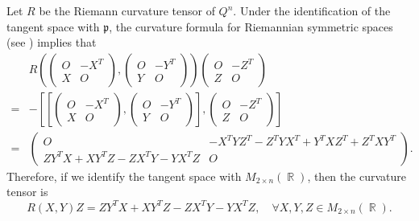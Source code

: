 \documentclass[11pt]{amsart}
\theoremstyle{plain}
\theoremstyle{definition}
\numberwithin{equation}{section}
\DeclareMathOperator{\R}{\mathbb{R}}
\newcommand{\Li}[1]{\mathfrak{#1}}
\begin{document}
Let $R$ be the Riemann curvature tensor of $Q^n$. Under the identification of the tangent space with $\Li{p}$, the curvature formula for Riemannian symmetric spaces (see \cite[\S 8.4]{Wol11}) implies that
\begin{align*}
    &R\left(\begin{pmatrix}
        O&-X^T\\
        X&O
    \end{pmatrix},\begin{pmatrix}
        O&-Y^T\\
        Y&O
    \end{pmatrix}\right)\begin{pmatrix}
        O&-Z^T\\
        Z&O
    \end{pmatrix}\\
    =&-\left[\left[\begin{pmatrix}
        O&-X^T\\
        X&O
    \end{pmatrix},\begin{pmatrix}
        O&-Y^T\\
        Y&O
    \end{pmatrix}\right],\begin{pmatrix}
        O&-Z^T\\
        Z&O
    \end{pmatrix}\right]\\
    =&\begin{pmatrix}
        O&-X^TYZ^T-Z^TYX^T+Y^TXZ^T+Z^TXY^T\\
        ZY^TX+XY^TZ-ZX^TY-YX^TZ&O
    \end{pmatrix}.
\end{align*}
Therefore, if we identify the tangent space with $M_{2\times n}(\R)$, then the curvature tensor is 
\begin{equation}\label{eq:CurvatureFormula}
    R(X,Y)Z=ZY^TX+XY^TZ-ZX^TY-YX^TZ, \quad \forall X,Y,Z\in M_{2\times n}(\R).
\end{equation}
\end{document}
